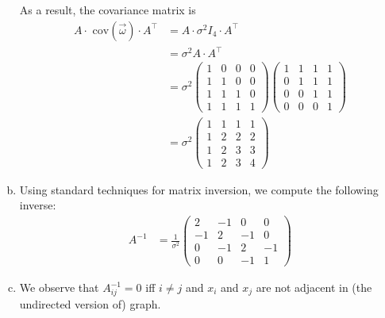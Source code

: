 \documentclass{mathnotes-linalg}
\begin{document}
\begin{exe}
\begin{enumerate}[(a)]
		As a result, the covariance matrix is 
		\begin{align*}
			A \cdot \text{ cov}( \vec \omega)\cdot  A^\top
			&= A \cdot \sigma^2 I_4 \cdot  A^\top\\
			&= \sigma^2 A \cdot  A^\top\\
			&= \sigma^2 \begin{pmatrix}
				1 & 0 & 0 & 0 \\
				1 & 1 & 0 & 0 \\
				1 & 1 & 1 & 0 \\
				1 & 1 & 1 & 1
			\end{pmatrix}
			\begin{pmatrix}
				1 & 1 & 1 & 1 \\
				0 & 1 & 1 & 1 \\
				0 & 0 & 1 & 1 \\
				0 & 0 & 0 & 1
			\end{pmatrix}\\
			&= \sigma^2 \begin{pmatrix}
				1 & 1 & 1 & 1 \\
				1 & 2 & 2 & 2 \\
				1 & 2 & 3 & 3 \\
				1 & 2 & 3 & 4
			\end{pmatrix}
		\end{align*}


	\item 
		Using standard techniques for matrix inversion, we compute the following inverse:
		\begin{align*}
			A^{-1} &= \frac 1 {\sigma^2}
			\begin{pmatrix}
				2 & -1 & 0 &0 \\
				-1 & 2 & -1 & 0 \\
				0 & -1 & 2 & -1 \\
				0 & 0 & -1 & 1
			\end{pmatrix}
		\end{align*}

	\item 
		We observe that $A^{-1}_{ij} = 0$ iff $i \neq j$ and $x_i$ and $x_j$ are not adjacent in (the undirected version of) graph.

\end{enumerate}	
\end{exe}	
\end{document}
